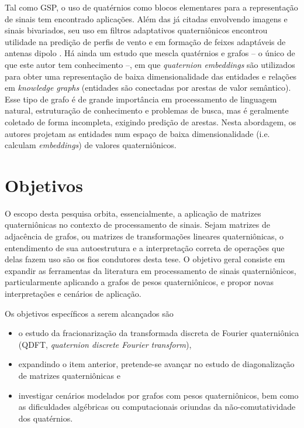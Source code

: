 Tal como GSP, o uso de quat\'ernios como blocos elementares para a representa\c c\~ao de sinais tem encontrado aplica\c c\~oes. Al\'em das j\'a citadas envolvendo imagens e sinais bivariados, seu uso em filtros adaptativos quaterni\^onicos encontrou utilidade na predi\c c\~ao de perfis de vento e em forma\c c\~ao de feixes adapt\'aveis de antenas dipolo \cite{jiang2014general}. H\'a ainda um estudo que mescla quat\'ernios e grafos \cite{zhang2019quaternion} -- o \'unico de que este autor tem conhecimento --, em que \emph{quaternion embeddings} s\~ao utilizados para obter uma representa\c c\~ao de baixa dimensionalidade das entidades e rela\c c\~oes em \emph{knowledge graphs} (entidades s\~ao conectadas por arestas de valor sem\^antico). Esse tipo de grafo \'e de grande import\^ancia em processamento de linguagem natural, estrutura\c c\~ao de conhecimento e problemas de busca, mas \'e geralmente coletado de forma incompleta, exigindo predi\c c\~ao de arestas. Nesta abordagem, os autores projetam as entidades num espa\c co de baixa dimensionalidade (i.e. calculam \emph{embeddings}) de valores quaterni\^onicos.


\section{Objetivos}

O escopo desta pesquisa orbita, essencialmente, a aplica\c c\~ao de matrizes quaterni\^onicas no contexto de processamento de sinais. Sejam matrizes de adjac\^encia de grafos, ou matrizes de transforma\c c\~oes lineares quaterni\^onicas, o entendimento de sua autoestrutura e a interpreta\c c\~ao correta de opera\c c\~oes que delas fazem uso s\~ao os fios condutores desta tese. O objetivo geral consiste em expandir as ferramentas da literatura em processamento de sinais quaterni\^onicos, particularmente aplicando a grafos de pesos quaterni\^onicos, e propor novas interpreta\c c\~oes e cen\'arios de aplica\c c\~ao.

Os objetivos espec\'ificos a serem alcan\c cados s\~ao
\begin{itemize}[noitemsep]
\item o estudo da fracionariza\c c\~ao da transformada discreta de Fourier quaterni\^onica (QDFT, \emph{quaternion discrete Fourier transform}),
\item expandindo o item anterior, pretende-se avan\c car no estudo de diagonaliza\c c\~ao de matrizes quaterni\^onicas e
\item investigar cen\'arios modelados por grafos com pesos quaterni\^onicos, bem como as dificuldades alg\'ebricas ou computacionais oriundas da n\~ao-comutatividade dos quat\'ernios.
\end{itemize}

